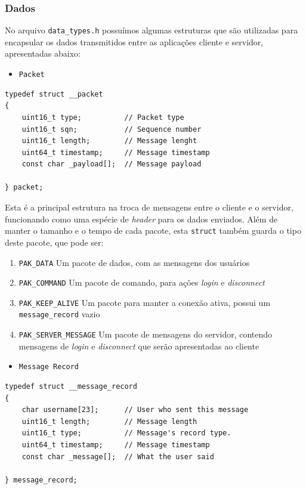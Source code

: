 \documentclass{article}
\begin{document}
\subsubsection{Dados}
No arquivo \texttt{data\_types.h} possuímos algumas estruturas que são utilizadas para encapsular os dados transmitidos entre as aplicações cliente e servidor, apresentadas abaixo:
\begin{itemize}
    \item \texttt{Packet}
\end{itemize}
\begin{lstlisting}
typedef struct __packet
{
    uint16_t type;          // Packet type
    uint16_t sqn;           // Sequence number
    uint16_t length;        // Message lenght
    uint64_t timestamp;     // Message timestamp
    const char _payload[];  // Message payload

} packet;
\end{lstlisting}
Esta é a principal estrutura na troca de mensagens entre o cliente e o servidor, funcionando como uma espécie de \textit{header} para os dados enviados. Além de manter o tamanho e o tempo de cada pacote, esta \texttt{struct} também guarda o tipo deste pacote, que pode ser:
\begin{enumerate}
    \item \texttt{PAK\_DATA} Um pacote de dados, com as mensagens dos usuários
    \item \texttt{PAK\_COMMAND} Um pacote de comando, para ações \textit{login} e \textit{disconnect}
    \item \texttt{PAK\_KEEP\_ALIVE} Um pacote para manter a conexão ativa, possui um \texttt{message\_record} vazio
    \item \texttt{PAK\_SERVER\_MESSAGE} Um pacote de mensagens do servidor, contendo mensagens de \textit{login} e \textit{disconnect} que serão apresentadas ao cliente
\end{enumerate}
\begin{itemize}
    \item \texttt{Message Record}
\end{itemize}
\begin{lstlisting}
typedef struct __message_record
{
    char username[23];      // User who sent this message
    uint16_t length;        // Message length
    uint16_t type;          // Message's record type.
    uint64_t timestamp;     // Message timestamp
    const char _message[];  // What the user said

} message_record;
\end{lstlisting}
\end{document}
